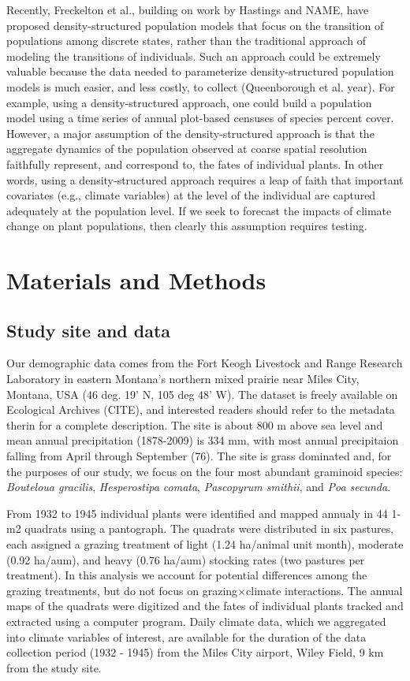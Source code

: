 \documentclass[12pt]{article}
\begin{document}
Recently, Freckelton et al., building on work by Hastings and NAME, have proposed density-structured population models that focus on the transition of populations among discrete states, rather than the traditional approach of modeling the transitions of individuals. Such an approach could be extremely valuable because the data needed to parameterize density-structured population models is much easier, and less costly, to collect (Queenborough et al. year). For example, using a density-structured approach, one could build a population model using a time series of annual plot-based censuses of species percent cover. However, a major assumption of the density-structured approach is that the aggregate dynamics of the population observed at coarse spatial resolution faithfully represent, and correspond to, the fates of individual plants. In other words, using a density-structured approach requires a leap of faith that important covariates (e.g., climate variables) at the level of the individual are captured adequately at the population level. If we seek to forecast the impacts of climate change on plant populations, then clearly this assumption requires testing.

\section{Materials and Methods}
\subsection{Study site and data}
Our demographic data comes from the Fort Keogh Livestock and Range Research Laboratory in eastern Montana's northern mixed prairie near Miles City, Montana, USA (46 deg. 19' N, 105 deg 48' W). The dataset is freely available on Ecological Archives (CITE), and interested readers should refer to the metadata therin for a complete description. The site is about 800 m above sea level and mean annual precipitation (1878-2009) is 334 mm, with most annual precipitaion falling from April through September (76). The site is grass dominated and, for the purposes of our study, we focus on the four most abundant graminoid species: \emph{Bouteloua gracilis}, \emph{Hesperostipa comata}, \emph{Pascopyrum smithii}, and \emph{Poa secunda}. 

From 1932 to 1945 individual plants were identified and mapped annualy in 44 1-m2 quadrats using a pantograph. The quadrats were distributed in six pastures, each assigned a grazing treatment of light (1.24 ha/animal unit month), moderate (0.92 ha/aum), and heavy (0.76 ha/aum) stocking rates (two pastures per treatment). In this analysis we account for potential differences among the grazing treatments, but do not focus on grazing$\times$climate interactions. The annual maps of the quadrats were digitized and the fates of individual plants tracked and extracted using a computer program. Daily climate data, which we aggregated into climate variables of interest, are available for the duration of the data collection period (1932 - 1945) from the Miles City airport, Wiley Field, 9 km from the study site.
\end{document}
